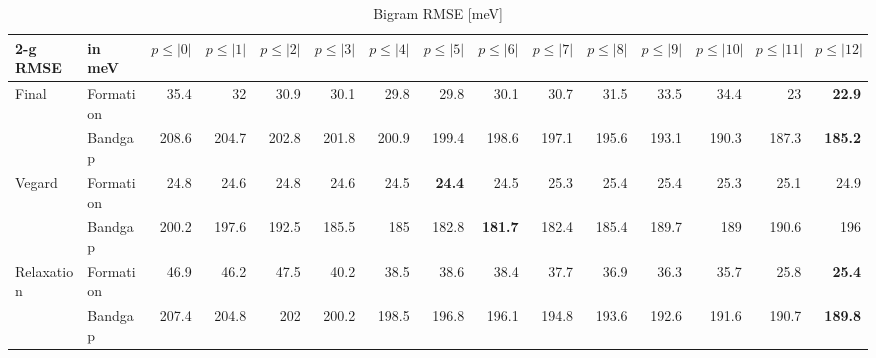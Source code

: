 \documentclass[11pt,oneside,czech,american]{book} %
\theoremstyle{definition} %
\theoremstyle{definition}
\begin{document}
\begin{table}[H]
	\scriptsize
	\centering
\begin{tabular}{llrrrrrrrrrrrrr}
	\hline
	2-g RMSE   & in meV   &   $p{\leq}|0|$ &   $p{\leq}|1|$ &   $p{\leq}|2|$ &   $p{\leq}|3|$ &   $p{\leq}|4|$ &   $p{\leq}|5|$ &   $p{\leq}|6|$ &   $p{\leq}|7|$ &   $p{\leq}|8|$ &   $p{\leq}|9|$ &   $p{\leq}|10|$ &   $p{\leq}|11|$ &   $p{\leq}|12|$ \\
	\hline
	\multirow{2}{*}{Final}      & Formation &       35.4 &       32   &       30.9 &       30.1 &       29.8 &       29.8 &       30.1 &       30.7 &       31.5 &       33.5 &        34.4 &        23   &        \textbf{22.9} \\
	      & Bandgap   &      208.6 &      204.7 &      202.8 &      201.8 &      200.9 &      199.4 &      198.6 &      197.1 &      195.6 &      193.1 &       190.3 &       187.3 &       \textbf{185.2} \\
	\multirow{2}{*}{Vegard}     & Formation &       24.8 &       24.6 &       24.8 &       24.6 &       24.5 &       \textbf{24.4} &       24.5 &       25.3 &       25.4 &       25.4 &        25.3 &        25.1 &        24.9 \\
	     & Bandgap   &      200.2 &      197.6 &      192.5 &      185.5 &      185   &      182.8 &      \textbf{181.7} &      182.4 &      185.4 &      189.7 &       189   &       190.6 &       196   \\
	\multirow{2}{*}{Relaxation} & Formation &       46.9 &       46.2 &       47.5 &       40.2 &       38.5 &       38.6 &       38.4 &       37.7 &       36.9 &       36.3 &        35.7 &        25.8 &        \textbf{25.4} \\
	 & Bandgap   &      207.4 &      204.8 &      202   &      200.2 &      198.5 &      196.8 &      196.1 &      194.8 &      193.6 &      192.6 &       191.6 &       190.7 &       \textbf{189.8} \\
	\hline
\end{tabular}
	\caption{Bigram RMSE [meV]}
	\label{2-g RMSE hat}
\end{table}
\end{document}
